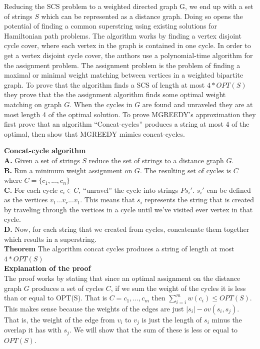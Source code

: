 \documentclass[letterpaper,11pt,titlepage]{article}
\begin{document}
Reducing the SCS problem to a weighted directed  graph G, we end up with a set of strings $S$ which can be represented as a distance graph. Doing so opens the potential of finding a common superstring using existing solutions for Hamiltonian path problems. The algorithm works by finding a vertex disjoint cycle cover, where each vertex in the graph is contained in one cycle. In order to get a vertex disjoint cycle cover, the authors use a polynomial-time algorithm for the assignment problem. The assignment problem is the problem of finding a maximal or minimal weight matching between vertices in a weighted bipartite graph. To prove that the algorithm finds a SCS of length at most $4 * OPT(S)$ they prove that the the assignment algorithm finds some optimal weight matching on graph $G$. When the cycles in $G$ are found and unraveled they are at most length 4 of the optimal solution. To prove MGREEDY's approximation they first prove that an algorithm ``Concat-cycles'' produces a string at most 4 of the optimal, then show that MGREEDY mimics concat-cycles.

\textbf{Concat-cycle algorithm}\\

\textbf{A.} Given a set of strings $S$ reduce the set of strings to a distance graph $G$. \\
\textbf{B.} Run a minimum weight assignment on $G$. The resulting set of cycles is $C$ where $C = \{c_1, ..., c_n\}$\\
\textbf{C.} For each cycle $c_i \in C$,  ``unravel'' the cycle into strings $Ps_i'$. $s_i'$ can be defined as the vertices $v_1 ... v_r ... v_1$. This means that $s_i$ represents the  string that is created by traveling through the vertices in a cycle until we've visited ever vertex in that cycle.\\
\textbf{D.} Now, for each string that we created from cycles, concatenate them together which results in a superstring.\\

\textbf{Theorem}
The algorithm concat cycles produces a string of length at most $4 * OPT(S)$\\

\textbf{Explanation of the proof}\\

The proof works by stating that since an optimal assignment on the distance graph $G$ produces a set of cycles $C$, if we sum the weight of the cycles it is less than or equal to OPT(S). That is $C = {c_1, ..., c_m}$ then $\sum_{i=i}^m w(c_i) \leq OPT(S)$. This makes sense because the weights of the edges are just $|s_i| - ov(s_i,s_j)$. That is, the weight of the edge from $v_i$ to $v_j$ is just the length of $s_i$ minus the overlap it has with $s_j$. We will show that the sum of these is less or equal to $OPT(S)$.
\end{document}
